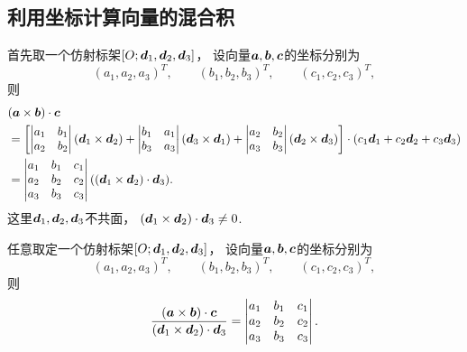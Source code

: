 \subsection{利用坐标计算向量的混合积}
首先取一个仿射标架\([O;\boldsymbol{d}_1,\boldsymbol{d}_2,\boldsymbol{d}_3]\)，
设向量\(\boldsymbol{a},\boldsymbol{b},\boldsymbol{c}\)的坐标分别为\begin{equation*}
	(a_1,a_2,a_3)^T, \qquad
	(b_1,b_2,b_3)^T, \qquad
	(c_1,c_2,c_3)^T,
\end{equation*}
则\begin{align*}
	&(\boldsymbol{a}\times\boldsymbol{b})\cdot\boldsymbol{c} \\
	&= 
		\left[
			\begin{vmatrix}
				a_1 & b_1 \\
				a_2 & b_2
			\end{vmatrix}
			(\boldsymbol{d}_1\times\boldsymbol{d}_2)
			+ \begin{vmatrix}
				b_1 & a_1 \\
				b_3 & a_3
			\end{vmatrix}
			(\boldsymbol{d}_3\times\boldsymbol{d}_1)
			+ \begin{vmatrix}
				a_2 & b_2 \\
				a_3 & b_3
			\end{vmatrix}
			(\boldsymbol{d}_2\times\boldsymbol{d}_3)
		\right]
	\cdot
		(c_1 \boldsymbol{d}_1 + c_2 \boldsymbol{d}_2 + c_3 \boldsymbol{d}_3)
	 \\
	&= \begin{vmatrix}
		a_1 & b_1 & c_1 \\
		a_2 & b_2 & c_2 \\
		a_3 & b_3 & c_3
	\end{vmatrix}
	((\boldsymbol{d}_1\times\boldsymbol{d}_2)\cdot\boldsymbol{d}_3).
\end{align*}
这里\(\boldsymbol{d}_1,\boldsymbol{d}_2,\boldsymbol{d}_3\)不共面，
\((\boldsymbol{d}_1\times\boldsymbol{d}_2)\cdot\boldsymbol{d}_3\neq0\).

\begin{theorem}
任意取定一个仿射标架\([O;\boldsymbol{d}_1,\boldsymbol{d}_2,\boldsymbol{d}_3]\)，
设向量\(\boldsymbol{a},\boldsymbol{b},\boldsymbol{c}\)的坐标分别为\begin{equation*}
	(a_1,a_2,a_3)^T, \qquad
	(b_1,b_2,b_3)^T, \qquad
	(c_1,c_2,c_3)^T,
\end{equation*}
则\begin{equation}
	\frac{(\boldsymbol{a}\times\boldsymbol{b})\cdot\boldsymbol{c}}
		{(\boldsymbol{d}_1\times\boldsymbol{d}_2)\cdot\boldsymbol{d}_3}
	= \begin{vmatrix}
		a_1 & b_1 & c_1 \\
		a_2 & b_2 & c_2 \\
		a_3 & b_3 & c_3
	\end{vmatrix}.
\end{equation}
\end{theorem}

